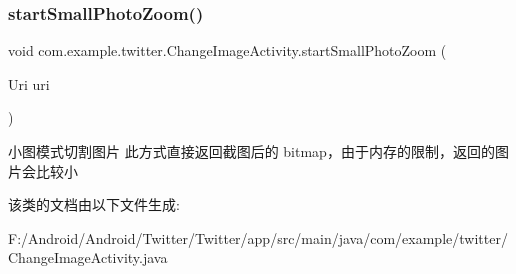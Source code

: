 \subsubsection{\texorpdfstring{start\+Small\+Photo\+Zoom()}{startSmallPhotoZoom()}}
{\footnotesize\ttfamily void com.\+example.\+twitter.\+Change\+Image\+Activity.\+start\+Small\+Photo\+Zoom (\begin{DoxyParamCaption}\item[{Uri}]{uri }\end{DoxyParamCaption})\hspace{0.3cm}{\ttfamily [inline]}}

小图模式切割图片 此方式直接返回截图后的 bitmap，由于内存的限制，返回的图片会比较小 

该类的文档由以下文件生成\+:\begin{DoxyCompactItemize}
\item 
F\+:/\+Android/\+Android/\+Twitter/\+Twitter/app/src/main/java/com/example/twitter/Change\+Image\+Activity.\+java\end{DoxyCompactItemize}
